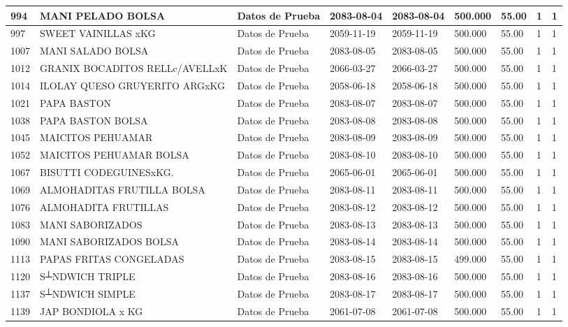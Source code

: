 \documentclass[a4paper,12pt]{article}
\begin{document}
\begin{landscape}
\begin{longtable}{|p{4cm}|p{2.5cm}|p{2.5cm}|p{1.8cm}|p{1.8cm}|p{1cm}|p{1cm}|p{3cm}|p{3cm}||}
994 & MANI PELADO BOLSA & Datos de Prueba & 2083-08-04 & 2083-08-04 & 500.000 & 55.00 & 1 & 1 \\ \hline 
997 & SWEET VAINILLAS xKG & Datos de Prueba & 2059-11-19 & 2059-11-19 & 500.000 & 55.00 & 1 & 1 \\ \hline 
1007 & MANI SALADO BOLSA & Datos de Prueba & 2083-08-05 & 2083-08-05 & 500.000 & 55.00 & 1 & 1 \\ \hline 
1012 & GRANIX BOCADITOS RELLc/AVELLxK & Datos de Prueba & 2066-03-27 & 2066-03-27 & 500.000 & 55.00 & 1 & 1 \\ \hline 
1014 & ILOLAY QUESO GRUYERITO ARGxKG & Datos de Prueba & 2058-06-18 & 2058-06-18 & 500.000 & 55.00 & 1 & 1 \\ \hline 
1021 & PAPA BASTON & Datos de Prueba & 2083-08-07 & 2083-08-07 & 500.000 & 55.00 & 1 & 1 \\ \hline 
1038 & PAPA BASTON BOLSA & Datos de Prueba & 2083-08-08 & 2083-08-08 & 500.000 & 55.00 & 1 & 1 \\ \hline 
1045 & MAICITOS PEHUAMAR & Datos de Prueba & 2083-08-09 & 2083-08-09 & 500.000 & 55.00 & 1 & 1 \\ \hline 
1052 & MAICITOS PEHUAMAR BOLSA & Datos de Prueba & 2083-08-10 & 2083-08-10 & 500.000 & 55.00 & 1 & 1 \\ \hline 
1067 & BISUTTI CODEGUINESxKG. & Datos de Prueba & 2065-06-01 & 2065-06-01 & 500.000 & 55.00 & 1 & 1 \\ \hline 
1069 & ALMOHADITAS FRUTILLA BOLSA & Datos de Prueba & 2083-08-11 & 2083-08-11 & 500.000 & 55.00 & 1 & 1 \\ \hline 
1076 & ALMOHADITA FRUTILLAS & Datos de Prueba & 2083-08-12 & 2083-08-12 & 500.000 & 55.00 & 1 & 1 \\ \hline 
1083 & MANI SABORIZADOS & Datos de Prueba & 2083-08-13 & 2083-08-13 & 500.000 & 55.00 & 1 & 1 \\ \hline 
1090 & MANI SABORIZADOS BOLSA & Datos de Prueba & 2083-08-14 & 2083-08-14 & 500.000 & 55.00 & 1 & 1 \\ \hline 
1113 & PAPAS FRITAS CONGELADAS & Datos de Prueba & 2083-08-15 & 2083-08-15 & 499.000 & 55.00 & 1 & 1 \\ \hline 
1120 & S┴NDWICH TRIPLE & Datos de Prueba & 2083-08-16 & 2083-08-16 & 500.000 & 55.00 & 1 & 1 \\ \hline 
1137 & S┴NDWICH SIMPLE & Datos de Prueba & 2083-08-17 & 2083-08-17 & 500.000 & 55.00 & 1 & 1 \\ \hline 
1139 & JAP BONDIOLA x KG & Datos de Prueba & 2061-07-08 & 2061-07-08 & 500.000 & 55.00 & 1 & 1 \\ \hline 

\end{longtable}
\end{landscape}
\end{document}
